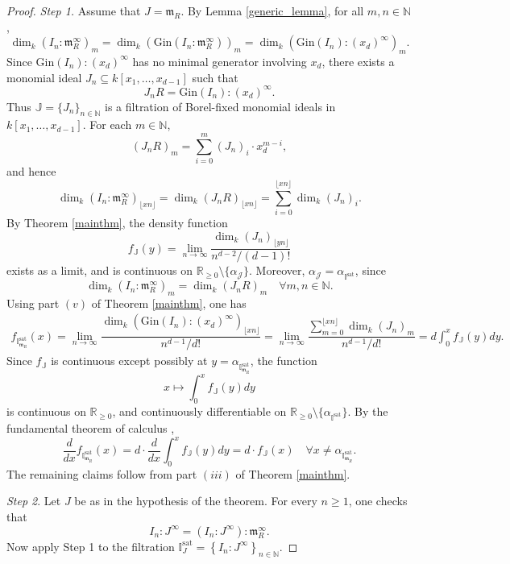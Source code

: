 \documentclass[12pt,a4paper]{amsart}
\theoremstyle{plain}
\theoremstyle{definition}
\numberwithin{equation}{theorem}
\newcommand{\mm}{\mathfrak{m}}
\begin{document}
\begin{proof}
\emph{Step 1.} Assume that $J = \mathfrak{m}_R$. By Lemma  \ref{generic_lemma}, for all $m, n \in \mathbb{N}$, $$\dim_k {\left(I_n \colon \mm_R^{\infty}\right)}_m = \dim_k {\left(\mathrm{Gin}\left(I_n \colon \mm_R^{\infty}\right)\right)}_m = \dim_k {\left(\mathrm{Gin}(I_n) \colon (x_d)^{\infty}\right)}_m.$$ Since $\mathrm{Gin}(I_n) \colon (x_d)^{\infty}$ has no minimal generator involving $x_d$, there exists a monomial ideal $J_n \subseteq k[x_1,\ldots,x_{d-1}]$ such that
\[
J_nR = \mathrm{Gin}(I_n) \colon (x_d)^{\infty}.
\]
Thus $\mathbb{J} = \{J_n\}_{n\in\mathbb{N}}$ is a filtration of Borel-fixed monomial ideals in $k[x_1,\ldots,x_{d-1}]$. For each $m\in\mathbb{N}$, $${(J_nR)}_m = \sum_{i=0}^m {(J_n)}_i\cdot x_d^{m-i},$$ and hence $$\dim_k {\left(I_n \colon \mm_R^{\infty}\right)}_{\lfloor xn \rfloor} = \dim_k {\left(J_nR\right)}_{\lfloor xn \rfloor} = \sum_{i=0}^{\lfloor xn \rfloor} \dim_k {(J_n)}_i.$$ By Theorem \ref{mainthm}, the density function $$f_{\mathbb{J}}(y) = \lim_{n\to\infty}\frac{\dim_k {\left(J_n\right)}_{\lfloor yn \rfloor}}{n^{d-2}/(d-1)!}$$ exists as a limit, and is continuous on $\mathbb{R}_{\geq 0}\setminus \{\alpha_{\mathcal{J}}\}$. Moreover, $\alpha_{\mathcal{J}} = \alpha_{\mathbb{I}^{\mathrm{sat}}}$, since $$\dim_k (I_n \colon \mm_R^{\infty})_m = \dim_k (J_n R)_m \quad \forall m,n\in\mathbb{N}.$$ Using part $(v)$ of Theorem \ref{mainthm}, one has
\begin{align*}
 f_{\mathbb{I}^{\mathrm{sat}}_{\mathfrak{m}_R}}(x) = \lim_{n\to\infty}\dfrac{\dim_k {\left(\mathrm{Gin}(I_n)\colon (x_d)^{\infty}\right)}_{\lfloor xn \rfloor}}{n^{d-1}/d!} = \lim_{n\to\infty}\dfrac{\sum_{m=0}^{\lfloor xn \rfloor}\dim_k {\left(J_n\right)}_m}{n^{d-1}/d!} = d\int_0^x f_{\mathbb{J}}(y)dy.
\end{align*}
Since $f_{\mathbb{J}}$ is continuous except possibly at $y = \alpha_{\mathbb{I}^{\mathrm{sat}}_{\mathfrak{m}_R}}$, the function $$x \mapsto \int_0^x f_{\mathbb{J}}(y)dy$$ is continuous on $\mathbb{R}_{\ge 0}$, and continuously differentiable on $\mathbb{R}_{\ge 0} \setminus \{\alpha_{\mathbb{I}^{\mathrm{sat}}}\}$. By the fundamental theorem of calculus \cite[Theorem 6.20]{Rud76}, $$\frac{d}{dx}f_{\mathbb{I}^{\mathrm{sat}}_{\mathfrak{m}_R}}(x) = d\cdot\frac{d}{dx}\int_0^x f_{\mathbb{J}}(y)dy = d\cdot f_{\mathbb{J}}(x) \quad \forall x\neq \alpha_{\mathbb{I}^{\mathrm{sat}}_{\mathfrak{m}_R}}.$$   The remaining claims follow from part $(iii)$ of Theorem \ref{mainthm}.

\emph{Step 2}. Let $J$ be as in the hypothesis of the theorem. For every $n \geq 1$, one checks that $$I_n \colon J^{\infty} = \left(I_n \colon J^{\infty}\right) \colon \mm_R^{\infty}.$$ Now apply Step 1 to the filtration $\mathbb{I}^{\mathrm{sat}}_J=\left\{I_n \colon J^{\infty}\right\}_{n\in\mathbb{N}}$.
\end{proof}
\end{document}
